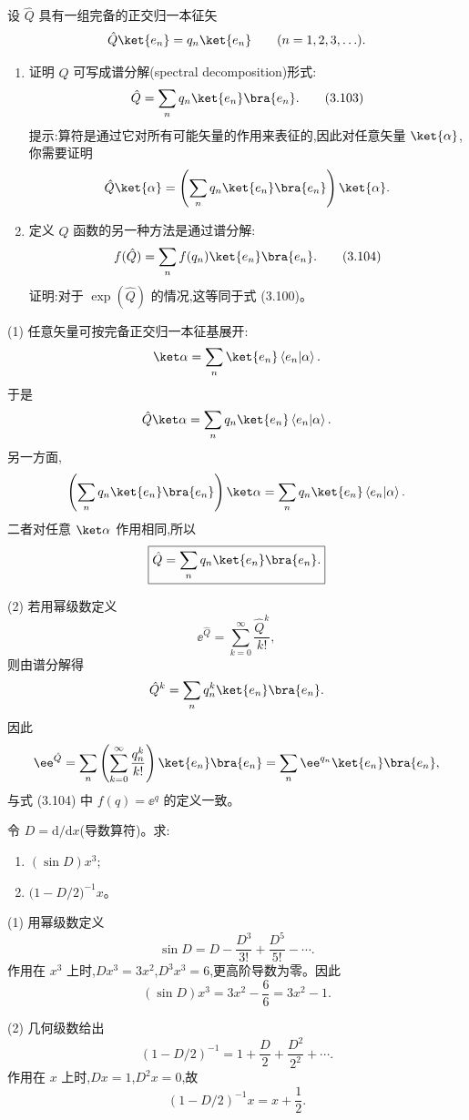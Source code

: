 \begin{question}
设 $\hat Q$ 具有一组完备的正交归一本征矢
\[
\hat Q\ket{e_n}=q_n\ket{e_n}\qquad(n=1,2,3,\ldots).
\]
\begin{enumerate}
\item 证明 $\hat Q$ 可写成谱分解(spectral decomposition)形式:
\[
\hat Q=\sum_n q_n\ket{e_n}\bra{e_n}.\tag{3.103}
\]
提示:算符是通过它对所有可能矢量的作用来表征的,因此对任意矢量 $\ket{\alpha}$,你需要证明
\[
\hat Q\ket{\alpha}=\left(\sum_n q_n\ket{e_n}\bra{e_n}\right)\ket{\alpha}.
\]
\item 定义 $\hat Q$ 函数的另一种方法是通过谱分解:
\[
f(\hat Q)=\sum_n f(q_n)\ket{e_n}\bra{e_n}.\tag{3.104}
\]
证明:对于 $\exp(\hat Q)$ 的情况,这等同于式 (3.100)。
\end{enumerate}

\par\smallskip
{}

\end{question}
\begin{solution}
(1) 任意矢量可按完备正交归一本征基展开:
\[
\ket\alpha=\sum_n \ket{e_n}\left\langle e_n|\alpha \right\rangle.
\]
于是
\[
\hat Q\ket\alpha=\sum_n q_n\ket{e_n}\left\langle e_n|\alpha \right\rangle.
\]
另一方面,
\[
\left(\sum_n q_n\ket{e_n}\bra{e_n}\right)\ket\alpha
=\sum_n q_n\ket{e_n}\left\langle e_n|\alpha \right\rangle.
\]
二者对任意 $\ket\alpha$ 作用相同,所以
\[
\boxed{\hat Q=\sum_n q_n\ket{e_n}\bra{e_n}.}
\]

(2) 若用幂级数定义
\[
\ee^{\hat Q}=\sum_{k=0}^{\infty}\frac{\hat Q^k}{k!},
\]
则由谱分解得
\[
\hat Q^k=\sum_n q_n^k\ket{e_n}\bra{e_n}.
\]
因此
\[
\ee^{\hat Q}=\sum_n\left(\sum_{k=0}^{\infty}\frac{q_n^k}{k!}\right)
\ket{e_n}\bra{e_n}
=\sum_n \ee^{q_n}\ket{e_n}\bra{e_n},
\]
与式 (3.104) 中 $f(q)=\ee^q$ 的定义一致。
\end{solution}

\begin{question}
令 $D=\mathrm d/\mathrm dx$(导数算符)。求:
\begin{enumerate}
\item $(\sin D)x^3$;
\item $\bigl(1-D/2\bigr)^{-1}x$。
\end{enumerate}
\end{question}
\begin{solution}
(1) 用幂级数定义
\[
\sin D=D-\frac{D^3}{3!}+\frac{D^5}{5!}-\cdots.
\]
作用在 $x^3$ 上时,$D x^3=3x^2$,$D^3x^3=6$,更高阶导数为零。因此
\[
(\sin D)x^3=3x^2-\frac{6}{6}=\boxed{3x^2-1}.
\]

(2) 几何级数给出
\[
(1-D/2)^{-1}=1+\frac D2+\frac{D^2}{2^2}+\cdots.
\]
作用在 $x$ 上时,$Dx=1$,$D^2x=0$,故
\[
(1-D/2)^{-1}x=x+\frac12.
\]
\end{solution}

